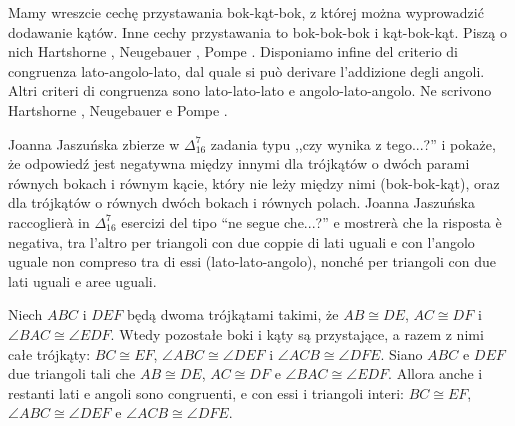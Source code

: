 Mamy wreszcie cechę przystawania bok-kąt-bok, z której można wyprowadzić dodawanie kątów. %
Inne cechy przystawania to bok-bok-bok i kąt-bok-kąt. %
Piszą o nich Hartshorne \cite[s. 99]{hartshorne_2000}, Neugebauer \cite[s. 8, 11]{neugebauer_2018}, Pompe \cite[s. 25]{pompe_2022}. %
Disponiamo infine del criterio di congruenza lato-angolo-lato, dal quale si può derivare l'addizione degli angoli. %
Altri criteri di congruenza sono lato-lato-lato e angolo-lato-angolo. %
Ne scrivono Hartshorne \cite[p. 99]{hartshorne_2000}, Neugebauer \cite[p. 8, 11]{neugebauer_2018} e Pompe \cite[p. 25]{pompe_2022}. %

Joanna Jaszuńska zbierze w $\Delta_{16}^{7}$ zadania typu ,,czy wynika z tego...?'' i pokaże, że odpowiedź jest negatywna między innymi dla trójkątów o dwóch parami równych bokach i równym kącie, który nie leży między nimi (bok-bok-kąt), oraz dla trójkątów o równych dwóch bokach i równych polach. %
Joanna Jaszuńska raccoglierà in $\Delta_{16}^{7}$ esercizi del tipo ``ne segue che...?'' e mostrerà che la risposta è negativa, tra l'altro per triangoli con due coppie di lati uguali e con l'angolo uguale non compreso tra di essi (lato-lato-angolo), nonché per triangoli con due lati uguali e aree uguali. %

\begin{axiom}
[przystawania, C6] %
[di congruenza, C6] %
    Niech $ABC$ i $DEF$ będą dwoma trójkątami takimi, że $AB \cong DE$, $AC \cong DF$ i $\angle BAC \cong \angle EDF$. %
    Wtedy pozostałe boki i kąty są przystające, a razem z nimi całe trójkąty: $BC \cong EF$, $\angle ABC \cong \angle DEF$ i $\angle ACB \cong \angle DFE$. %
    Siano $ABC$ e $DEF$ due triangoli tali che $AB \cong DE$, $AC \cong DF$ e $\angle BAC \cong \angle EDF$. %
    Allora anche i restanti lati e angoli sono congruenti, e con essi i triangoli interi: $BC \cong EF$, $\angle ABC \cong \angle DEF$ e $\angle ACB \cong \angle DFE$. %
\end{axiom}

